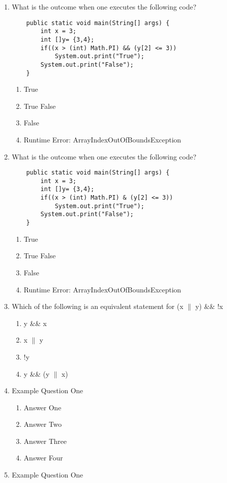 \documentclass[11pt,fleqn]{article}
\begin{document}
\begin{enumerate}
\begin{enumerate}
	\end{enumerate}
\item What is the outcome when one executes the following code?
	\begin{verbatim}
	public static void main(String[] args) {
		int x = 3;
		int []y= {3,4};
		if((x > (int) Math.PI) && (y[2] <= 3)) 
			System.out.print("True");
		System.out.print("False");
	}
	\end{verbatim}
	\begin{enumerate}
	\item True
	\item True False
	\item False
	\item Runtime Error: ArrayIndexOutOfBoundsException
	\end{enumerate}
\item What is the outcome when one executes the following code?
	\begin{verbatim}
	public static void main(String[] args) {
		int x = 3;
		int []y= {3,4};
		if((x > (int) Math.PI) & (y[2] <= 3)) 
			System.out.print("True");
		System.out.print("False");
	}
	\end{verbatim}
	\begin{enumerate}
	\item True
	\item True False
	\item False
	\item Runtime Error: ArrayIndexOutOfBoundsException
	\end{enumerate}
\item Which of the following is an equivalent statement for (x $\|$ y) $\&\&$ !x
	\begin{enumerate}
	\item y \&\& x
	\item x $\|$ y
	\item !y
	\item y \&\& (y $\|$ x)
	\end{enumerate}
\item Example Question One
	\begin{enumerate}
	\item Answer One
	\item Answer Two
	\item Answer Three
	\item Answer Four
	\end{enumerate}
\item Example Question One
	\begin{enumerate}

\end{enumerate}
\end{enumerate}
\end{document}
